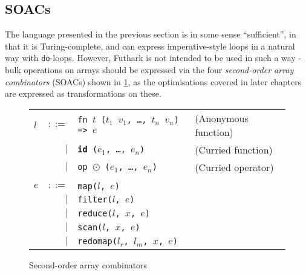 \documentclass[oneside]{memoir}
\begin{document}
\subsection{SOACs}
\label{sec:soacs}

The language presented in the previous section is in some sense
``sufficient'', in that it is Turing-complete, and can express
imperative-style loops in a natural way with \texttt{do}-loops.
However, Futhark is not intended to be used in such a way - bulk
operations on arrays should be expressed via the four
\textit{second-order array combinators} (SOACs) shown in
\cref{fig:soacs}, as the optimisations covered in later chapters are
expressed as transformations on these.

\begin{figure}[bt]
\begin{tabular}{lrll}
$l$ & $::=$ & \texttt{fn $t$ ($t_{1}$ $v_{1}$, \ldots, $t_{n}$ $v_{n}$) => $e$} & (Anonymous function) \\
& $|$ & \texttt{\textbf{id} ($e_{1}$, \ldots, $e_{n}$)} & (Curried function) \\
& $|$ & \texttt{op $\odot$ ($e_{1}$, \ldots, $e_{n}$)} & (Curried operator) \\
\\
$e$ & $::=$ & \texttt{map($l$, $e$)} \\
    & $|$ & \texttt{filter($l$, $e$)} \\
    & $|$ & \texttt{reduce($l$, $x$, $e$)} \\
    & $|$ & \texttt{scan($l$, $x$, $e$)} \\
    & $|$ & \texttt{redomap($l_{r}$, $l_{m}$, $x$, $e$)} \\
\end{tabular}
\caption{Second-order array combinators}
\label{fig:soacs}
\end{figure}
\end{document}
